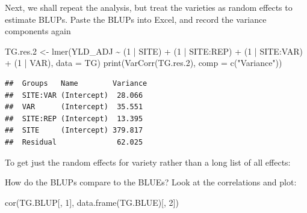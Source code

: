 \documentclass[
]{book}
\newenvironment{Shaded}{\begin{snugshade}}{\end{snugshade}}
\newcommand{\AttributeTok}[1]{\textcolor[rgb]{0.77,0.63,0.00}{#1}}
\newcommand{\DecValTok}[1]{\textcolor[rgb]{0.00,0.00,0.81}{#1}}
\newcommand{\FloatTok}[1]{\textcolor[rgb]{0.00,0.00,0.81}{#1}}
\newcommand{\FunctionTok}[1]{\textcolor[rgb]{0.00,0.00,0.00}{#1}}
\newcommand{\NormalTok}[1]{#1}
\newcommand{\OtherTok}[1]{\textcolor[rgb]{0.56,0.35,0.01}{#1}}
\newcommand{\SpecialCharTok}[1]{\textcolor[rgb]{0.00,0.00,0.00}{#1}}
\newcommand{\StringTok}[1]{\textcolor[rgb]{0.31,0.60,0.02}{#1}}
\begin{document}
Next, we shall repeat the analysis, but treat the varieties as random effects to estimate BLUPs. Paste the BLUPs into Excel, and record the variance components again

\begin{Shaded}
\begin{Highlighting}[]
\NormalTok{TG.res}\FloatTok{.2} \OtherTok{\textless{}{-}} \FunctionTok{lmer}\NormalTok{(YLD\_ADJ }\SpecialCharTok{\textasciitilde{}}\NormalTok{ (}\DecValTok{1} \SpecialCharTok{|}\NormalTok{ SITE) }\SpecialCharTok{+}\NormalTok{ (}\DecValTok{1} \SpecialCharTok{|}\NormalTok{ SITE}\SpecialCharTok{:}\NormalTok{REP) }\SpecialCharTok{+}\NormalTok{ (}\DecValTok{1} \SpecialCharTok{|} 
\NormalTok{    SITE}\SpecialCharTok{:}\NormalTok{VAR) }\SpecialCharTok{+}\NormalTok{ (}\DecValTok{1} \SpecialCharTok{|}\NormalTok{ VAR), }\AttributeTok{data =}\NormalTok{ TG)}
\FunctionTok{print}\NormalTok{(}\FunctionTok{VarCorr}\NormalTok{(TG.res}\FloatTok{.2}\NormalTok{), }\AttributeTok{comp =} \FunctionTok{c}\NormalTok{(}\StringTok{"Variance"}\NormalTok{))}
\end{Highlighting}
\end{Shaded}

\begin{verbatim}
##  Groups   Name        Variance
##  SITE:VAR (Intercept)  28.066 
##  VAR      (Intercept)  35.551 
##  SITE:REP (Intercept)  13.395 
##  SITE     (Intercept) 379.817 
##  Residual              62.025
\end{verbatim}

To get just the random effects for variety rather than a long list of all effects:

\begin{Shaded}
\end{Shaded}

How do the BLUPs compare to the BLUEs? Look at the correlations and plot:

\begin{Shaded}
\begin{Highlighting}[]
\FunctionTok{cor}\NormalTok{(TG.BLUP[, }\DecValTok{1}\NormalTok{], }\FunctionTok{data.frame}\NormalTok{(TG.BLUE)[, }\DecValTok{2}\NormalTok{])}
\end{Highlighting}
\end{Shaded}
\end{document}
